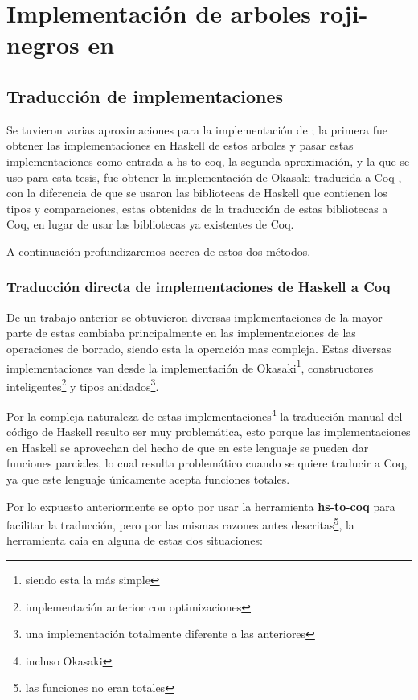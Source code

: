 \chapter{Implementación de arboles roji-negros en {\coq}}

\section{Traducción de implementaciones}
Se tuvieron varias aproximaciones para la implementación de {\arns}; la primera fue obtener las
implementaciones en Haskell de estos arboles \cite{tesisG} y pasar estas implementaciones como entrada a
hs-to-coq, la segunda aproximación, y la que se uso para esta tesis, fue obtener la implementación
de Okasaki traducida a Coq \cite{MSetRBT}, con la diferencia de que se usaron las bibliotecas de
Haskell que contienen los tipos y comparaciones, estas obtenidas de la traducción de estas
bibliotecas a Coq, en lugar de usar las bibliotecas ya existentes de Coq.

A continuación profundizaremos acerca de estos dos métodos.

\subsection{Traducción directa de implementaciones de Haskell a Coq}
De un trabajo anterior\cite{tesisG} se obtuvieron diversas implementaciones de {\arns} la mayor
parte de estas cambiaba principalmente en las implementaciones de las operaciones de borrado,
siendo esta la operación mas compleja.
Estas diversas implementaciones van desde la implementación de Okasaki\footnote{siendo esta la
m\'as simple}, constructores inteligentes\footnote{implementaci\'on anterior con optimizaciones} y
tipos anidados\footnote{una implementaci\'on totalmente diferente a las anteriores}.

Por la compleja naturaleza de estas implementaciones\footnote{incluso Okasaki} la traducción
manual del código de Haskell resulto ser muy problemática, esto porque las implementaciones en
Haskell se aprovechan del hecho de que en este lenguaje se pueden dar funciones parciales, lo cual
resulta problemático cuando se quiere traducir a Coq, ya que este lenguaje únicamente acepta
funciones totales.

Por lo expuesto anteriormente se opto por usar la herramienta \textbf{hs-to-coq} para facilitar la
traducci\'on, pero por las mismas razones antes descritas\footnote{las funciones no eran totales},
la herramienta caia en alguna de estas dos situaciones:

